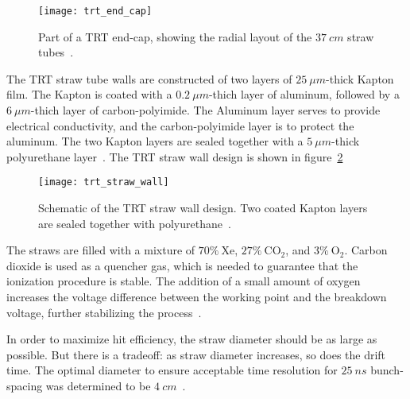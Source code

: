 \begin{figure}[!ht]\centering
\texttt{[image: trt\_end\_cap]}
\caption{Part of a TRT end-cap, showing the radial layout of the $37~cm$ straw tubes~\cite{trt-2013}.}
\label{fig:trt_end_cap}
\end{figure}

The TRT straw tube walls are constructed of two layers of $25~\mu m$-thick Kapton film.
The Kapton is coated with a $0.2~\mu m$-thich layer of aluminum, followed by a $6~\mu m$-thich layer of carbon-polyimide.
The Aluminum layer serves to provide electrical conductivity, and the carbon-polyimide layer is to protect the aluminum.
The two Kapton layers are sealed together with a $5~\mu m$-thick polyurethane layer~\cite{trt-2013}.
The TRT straw wall design is shown in figure~\ref{fig:trt_straw_wall}

\begin{figure}[!ht]\centering
\texttt{[image: trt\_straw\_wall]}
\caption{Schematic of the TRT straw wall design. Two coated Kapton layers are sealed together with polyurethane~\cite{trt-2013}.}
\label{fig:trt_straw_wall}
\end{figure}

The straws are filled with a mixture of $70\%~\mathrm{Xe}$, $27\%~\mathrm{CO_2}$, and $3\%~\mathrm{O_2}$.
Carbon dioxide is used as a quencher gas, which is needed to guarantee that the ionization procedure is stable.
The addition of a small amount of oxygen increases the voltage difference between the working point and the breakdown voltage, further stabilizing the process~\cite{trt-2013}.

In order to maximize hit efficiency, the straw diameter should be as large as possible.
But there is a tradeoff: as straw diameter increases, so does the drift time.
The optimal diameter to ensure acceptable time resolution for $25~ns$ bunch-spacing was determined to be $4~cm$~\cite{trt-2013}.

